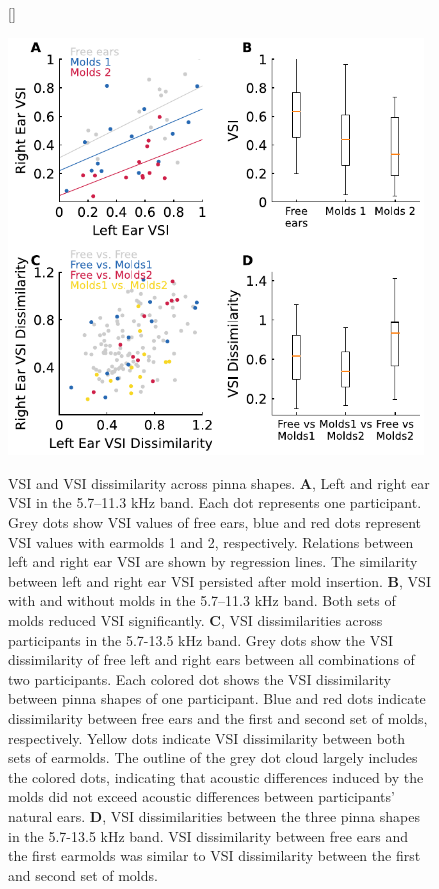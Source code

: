 \begin{figure}[t]
[\FBwidth]
{\caption{VSI and VSI dissimilarity across pinna shapes. \textbf{A}, Left and right ear VSI in the 5.7–11.3 kHz band. Each dot represents one participant. Grey dots show VSI values of free ears, blue and red dots represent VSI values with earmolds 1 and 2, respectively. Relations between left and right ear VSI are shown by regression lines. The similarity between left and right ear VSI persisted after mold insertion. \textbf{B}, VSI with and without molds in the 5.7–11.3 kHz band. Both sets of molds reduced VSI significantly. \textbf{C}, VSI dissimilarities across participants in the 5.7-13.5 kHz band. Grey dots show the VSI dissimilarity of free left and right ears between all combinations of two participants. Each colored dot shows the VSI dissimilarity between pinna shapes of one participant. Blue and red dots indicate dissimilarity between free ears and the first and second set of molds, respectively. Yellow dots indicate VSI dissimilarity between both sets of earmolds. The outline of the grey dot cloud largely includes the colored dots, indicating that acoustic differences induced by the molds did not exceed acoustic differences between participants' natural ears. \textbf{D}, VSI dissimilarities between the three pinna shapes in the 5.7-13.5 kHz band. VSI dissimilarity between free ears and the first earmolds was similar to VSI dissimilarity between the first and second set of molds.}
\label{fig:molds_vsi}}
{\includegraphics[width=11cm]{../Results/figures/fig4/fig4}}
\end{figure}

